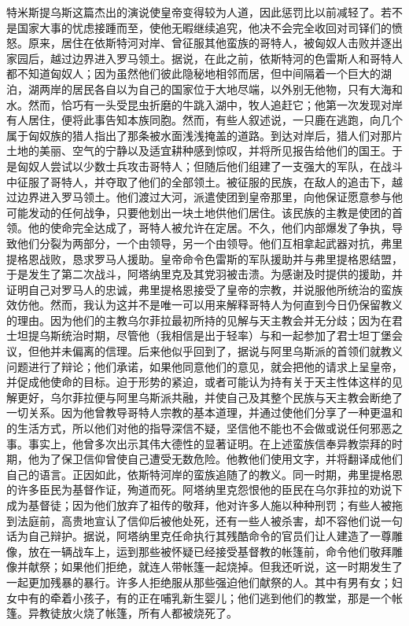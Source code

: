 特米斯提乌斯这篇杰出的演说使皇帝变得较为人道，因此惩罚比以前减轻了。若不是国家大事的忧虑接踵而至，使他无暇继续追究，他决不会完全收回对司铎们的愤怒。原来，居住在依斯特河对岸、曾征服其他蛮族的哥特人，被匈奴人击败并逐出家园后，越过边界进入罗马领土。据说，在此之前，依斯特河的色雷斯人和哥特人都不知道匈奴人；因为虽然他们彼此隐秘地相邻而居，但中间隔着一个巨大的湖泊，湖两岸的居民各自以为自己的国家位于大地尽端，以外别无他物，只有大海和水。然而，恰巧有一头受昆虫折磨的牛跳入湖中，牧人追赶它；他第一次发现对岸有人居住，便将此事告知本族同胞。然而，有些人叙述说，一只鹿在逃跑，向几个属于匈奴族的猎人指出了那条被水面浅浅掩盖的道路。到达对岸后，猎人们对那片土地的美丽、空气的宁静以及适宜耕种感到惊叹，并将所见报告给他们的国王。于是匈奴人尝试以少数士兵攻击哥特人；但随后他们组建了一支强大的军队，在战斗中征服了哥特人，并夺取了他们的全部领土。被征服的民族，在敌人的追击下，越过边界进入罗马领土。他们渡过大河，派遣使团到皇帝那里，向他保证愿意参与他可能发动的任何战争，只要他划出一块土地供他们居住。该民族的主教是使团的首领。他的使命完全达成了，哥特人被允许在定居。不久，他们内部爆发了争执，导致他们分裂为两部分，一个由领导，另一个由领导。他们互相拿起武器对抗，弗里提格恩战败，恳求罗马人援助。皇帝命令色雷斯的军队援助并与弗里提格恩结盟，于是发生了第二次战斗，阿塔纳里克及其党羽被击溃。为感谢及时提供的援助，并证明自己对罗马人的忠诚，弗里提格恩接受了皇帝的宗教，并说服他所统治的蛮族效仿他。然而，我认为这并不是唯一可以用来解释哥特人为何直到今日仍保留教义的理由。因为他们的主教乌尔菲拉最初所持的见解与天主教会并无分歧；因为在君士坦提乌斯统治时期，尽管他（我相信是出于轻率）与和一起参加了君士坦丁堡会议，但他并未偏离的信理。后来他似乎回到了，据说与阿里乌斯派的首领们就教义问题进行了辩论；他们承诺，如果他同意他们的意见，就会把他的请求上呈皇帝，并促成他使命的目标。迫于形势的紧迫，或者可能认为持有关于天主性体这样的见解更好，乌尔菲拉便与阿里乌斯派共融，并使自己及其整个民族与天主教会断绝了一切关系。因为他曾教导哥特人宗教的基本道理，并通过使他们分享了一种更温和的生活方式，所以他们对他的指导深信不疑，坚信他不能也不会做或说任何邪恶之事。事实上，他曾多次出示其伟大德性的显著证明。在上述蛮族信奉异教崇拜的时期，他为了保卫信仰曾使自己遭受无数危险。他教他们使用文字，并将翻译成他们自己的语言。正因如此，依斯特河岸的蛮族追随了的教义。同一时期，弗里提格恩的许多臣民为基督作证，殉道而死。阿塔纳里克怨恨他的臣民在乌尔菲拉的劝说下成为基督徒；因为他们放弃了祖传的敬拜，他对许多人施以种种刑罚；有些人被拖到法庭前，高贵地宣认了信仰后被他处死，还有一些人被杀害，却不容他们说一句话为自己辩护。据说，阿塔纳里克任命执行其残酷命令的官员们让人建造了一尊雕像，放在一辆战车上，运到那些被怀疑已经接受基督教的帐篷前，命令他们敬拜雕像并献祭；如果他们拒绝，就连人带帐篷一起烧掉。但我还听说，这一时期发生了一起更加残暴的暴行。许多人拒绝服从那些强迫他们献祭的人。其中有男有女；妇女中有的牵着小孩子，有的正在哺乳新生婴儿；他们逃到他们的教堂，那是一个帐篷。异教徒放火烧了帐篷，所有人都被烧死了。\par


